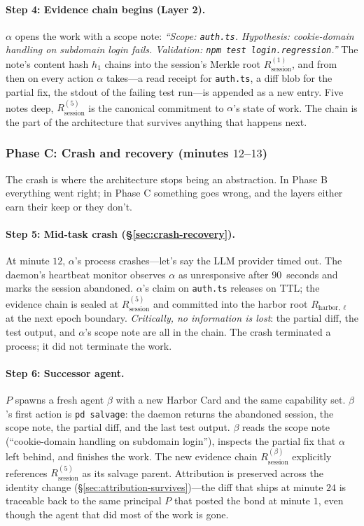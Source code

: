 \documentclass[11pt,a4paper]{article}
\theoremstyle{definition}
\theoremstyle{remark}
\begin{document}
\paragraph{Step 4: Evidence chain begins (Layer 2).} $\alpha$ opens the work with a scope note: \emph{``Scope: \texttt{auth.ts}. Hypothesis: cookie-domain handling on subdomain login fails. Validation: \texttt{npm test login.regression}.''} The note's content hash $h_1$ chains into the session's Merkle root $R_{\text{session}}^{(1)}$, and from then on every action $\alpha$ takes---a read receipt for \texttt{auth.ts}, a diff blob for the partial fix, the stdout of the failing test run---is appended as a new entry. Five notes deep, $R_{\text{session}}^{(5)}$ is the canonical commitment to $\alpha$'s state of work. The chain is the part of the architecture that survives anything that happens next.

\subsubsection*{Phase C: Crash and recovery (minutes $12$--$13$)}

The crash is where the architecture stops being an abstraction. In Phase B everything went right; in Phase C something goes wrong, and the layers either earn their keep or they don't.

\paragraph{Step 5: Mid-task crash (\S\ref{sec:crash-recovery}).} At minute $12$, $\alpha$'s process crashes---let's say the LLM provider timed out. The daemon's heartbeat monitor observes $\alpha$ as unresponsive after $90$~seconds and marks the session abandoned. $\alpha$'s claim on \texttt{auth.ts} releases on TTL; the evidence chain is sealed at $R_{\text{session}}^{(5)}$ and committed into the harbor root $R_{\text{harbor},\ell}$ at the next epoch boundary. \emph{Critically, no information is lost}: the partial diff, the test output, and $\alpha$'s scope note are all in the chain. The crash terminated a process; it did not terminate the work.

\paragraph{Step 6: Successor agent.} $P$ spawns a fresh agent $\beta$ with a new Harbor Card and the same capability set. $\beta$'s first action is \texttt{pd salvage}: the daemon returns the abandoned session, the scope note, the partial diff, and the last test output. $\beta$ reads the scope note (``cookie-domain handling on subdomain login''), inspects the partial fix that $\alpha$ left behind, and finishes the work. The new evidence chain $R_{\text{session}}^{(\beta)}$ explicitly references $R_{\text{session}}^{(5)}$ as its salvage parent. Attribution is preserved across the identity change (\S\ref{sec:attribution-survives})---the diff that ships at minute $24$ is traceable back to the same principal $P$ that posted the bond at minute $1$, even though the agent that did most of the work is gone.
\end{document}
